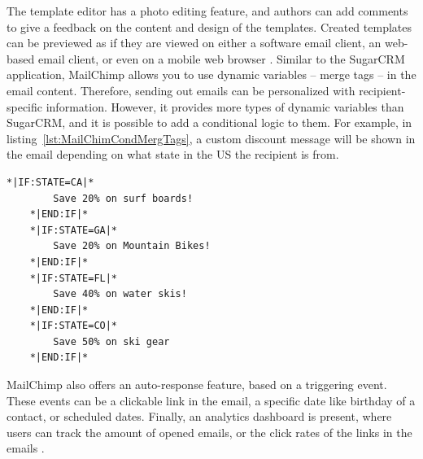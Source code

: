 The template editor has a photo editing feature, and authors can add comments to give a feedback on the content and design of the templates. Created templates can be previewed as if they are viewed on either a software email client, an web-based email client, or even on a mobile web browser \citep{TheRocketScienceGroupLLC2013a}. Similar to the SugarCRM application, MailChimp allows you to use dynamic variables -- merge tags -- in the email content. Therefore, sending out emails can be personalized with recipient-specific information. However, it provides more types of dynamic variables than SugarCRM, and it is possible to add a conditional logic to them. For example, in listing~\ref{lst:MailChimCondMergTags}, a custom discount message will be shown in the email depending on what state in the US the recipient is from.
\vspace{1cm}


\begin{lstlisting}[language=XML, caption={[MailChimp's Conditional Merge Tags]MailChimp's Conditional Merge Tags \citep{TheRocketScienceGroupLLC2013b}}, label={lst:MailChimCondMergTags}]
	*|IF:STATE=CA|*
		Save 20% on surf boards!
	*|END:IF|* 
	*|IF:STATE=GA|*
		Save 20% on Mountain Bikes!
	*|END:IF|* 
	*|IF:STATE=FL|*
		Save 40% on water skis!
	*|END:IF|* 
	*|IF:STATE=CO|*
		Save 50% on ski gear
	*|END:IF|*
\end{lstlisting}

MailChimp also offers an auto-response feature, based on a triggering event. These events can be a clickable link in the email, a specific date like birthday of a contact, or scheduled dates. Finally, an analytics dashboard is present, where users can track the amount of opened emails, or the click rates of the links in the emails \citep{TheRocketScienceGroupLLC2013c,TheRocketScienceGroupLLC2013d,TheRocketScienceGroupLLC2013e}.

